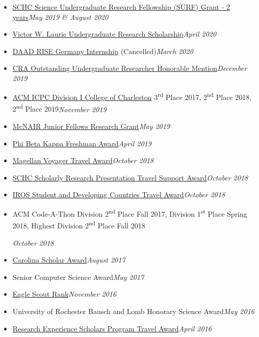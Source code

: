 \documentclass[\ifdefined\cv11pt\else10pt\fi,letterpaper]{moderncv}
\newcommand{\cvonly}[1]{\ifdefined\cv#1\fi\ignorespaces}
\renewcommand{\cvitem}[2]{\item {#1}\hfill\textit{#2}}
\newcommand{\st}{\textsuperscript{st}\xspace}
\newcommand{\nd}{\textsuperscript{nd}\xspace}
\newcommand{\rd}{\textsuperscript{rd}\xspace}
\begin{document}
\begin{itemize}
	\cvitem{\href{https://www.sc.edu/study/colleges_schools/honors_college/internal/beyond_the_classroom/undergraduate_research/surf_and_exploration_grants/index.php}{SCHC Science Undergraduate Research Fellowship (SURF) Grant - 2 years}}{May 2019 \& August 2020}
	\cvitem{\href{https://sc.edu/study/colleges_schools/artsandsciences/mathematics/study/awards_scholarships/}{Victor W. Laurie Undergraduate Research Scholarship}}{April 2020}
	\cvitem{\href{https://www.daad.de/rise/en/rise-germany/}{DAAD RISE Germany Internship} (Cancelled)}{March 2020}
	\cvitem{\href{https://cra.org/about/awards/outstanding-undergraduate-researcher-award/}{CRA Outstanding Undergraduate Researcher Honorable Mention}}{December 2019}
	\cvonly{\cvitem{\href{http://compsci.cofc.edu/ACM-ICPC.php}{ACM ICPC Division I College of Charleston} 3\rd Place 2017, 2\nd Place 2018, 2\nd Place 2019}{November 2019}}
	\cvitem{\href{https://sc.edu/about/offices_and_divisions/undergraduate_research/apply_for_funding/other_money_opportunities/cec_mcnair-research-fellows-summer/index.php}{McNAIR Junior Fellows Research Grant}}{May 2019}
	\cvitem{\href{https://www.sc.edu/uofsc/announcements/posts/2019/04/university_awards_day_2019.php}{Phi Beta Kappa Freshman Award}}{April 2019}
	\cvitem{\href{https://www.sc.edu/about/offices_and_divisions/undergraduate_research/apply_for_funding/our_funding/conference-travel/index.php}{Magellan Voyager Travel Award}}{October 2018}
	\cvitem{\href{https://www.sc.edu/study/colleges_schools/honors_college/experience/undergraduate_research/index.php}{SCHC Scholarly Research Presentation Travel Support Award}}{October 2018}
	\cvitem{\href{https://www.iros2018.org/travel-grants}{IROS Student and Developing Countries Travel Award}}{October 2018}
	\cvonly{\cvitem{\parbox[t]{0.75\linewidth}{ACM Code-A-Thon Division 2\nd Place Fall 2017, Division 1\st Place Spring 2018, Highest Division 2\nd Place Fall 2018}\vspace*{0.6ex}}{October 2018}}
	\cvitem{\href{https://sc.edu/about/offices_and_divisions/undergraduate_admissions/honors_and_scholars_programs/top_scholars/}{Carolina Scholar Award}}{August 2017}
	\cvonly{\cvitem{Senior Computer Science Award}{May 2017}}
	\cvitem{\href{https://en.wikipedia.org/wiki/Eagle_Scout_\%28Boy_Scouts_of_America\%29}{Eagle Scout Rank}}{November 2016}
	\cvonly{\cvitem{University of Rochester Bausch and Lomb Honorary Science Award}{May 2016}}
	\cvonly{\cvitem{\href{https://www.scgssm.org/residential/academics/senior-research}{Research Experience Scholars Program Travel Award}}{April 2016}}
\end{itemize}
\end{document}
